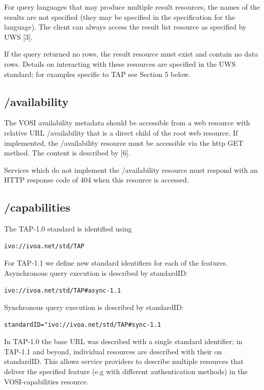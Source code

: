 \documentclass[11pt,a4paper]{ivoa}
\begin{document}
For query languages that may produce multiple result resources, the names of the 
results are not specified (they may be specified in the specification for the 
language). The client can always access the result list resource as specified by 
UWS [3].

If the query returned no rows, the result resource must exist and contain no 
data rows. Details on interacting with these resources are specified in the UWS 
standard; for examples specific to TAP see Section 5 below.

\subsection{/availability}
The VOSI availability metadata should be accessible from a web resource with 
relative URL /availability that is a direct child of the root web resource. If 
implemented, the /availability resource must be accessible via the http GET 
method. The content is described by [6].

Services which do not implement the /availability resource must respond with an 
HTTP response code of 404 when this resource is accessed.

\subsection{/capabilities}
The TAP-1.0 standard is identified using 
\begin{verbatim}
ivo://ivoa.net/std/TAP
\end{verbatim}

For TAP-1.1 we define new standard identifiers for each of the 
features. Asynchronous query execution is described by standardID: 

\begin{verbatim}
ivo://ivoa.net/std/TAP#async-1.1 
\end{verbatim}

Synchronous query execution is described by standardID:

\begin{verbatim}
standardID="ivo://ivoa.net/std/TAP#sync-1.1 
\end{verbatim}

In TAP-1.0 the base URL was described with a single standard identifier; in 
TAP-1.1 and beyond, individual resources are described with their on 
standardID. This allows service providers to describe multiple resources that 
deliver the specified feature (e.g with different authentication methods) in 
the VOSI-capabilities resource.
\end{document}
